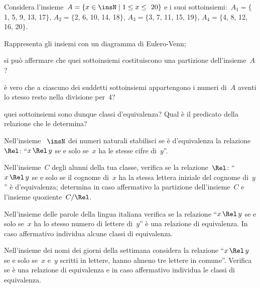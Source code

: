 \begin{multicols}{2}
\begin{esercizio}
\label{ese:7.30}
Considera l'insieme~$A = \{x\in\insN \mid  1 \le x \le~20 \}$ e i suoi
sottoinsiemi:~$A_1 =\{$1, 5, 9, 13, 17$\}$, $A_2 =\{$2, 6, 10, 14, 18$\}$, $A_3 =\{$3, 7, 11, 15, 19$\}$, $A_4 =\{$4, 8, 12, 16, 20$\}$.
\begin{enumeratea}
\item Rappresenta gli insiemi con un diagramma di Eulero-Venn;
\item si può affermare che quei sottoinsiemi costituiscono una partizione dell'insieme~$A$?
\item è vero che a ciascuno dei suddetti sottoinsiemi appartengono i numeri di~$A$ aventi lo stesso resto nella divisione per~4?
\item quei sottoinsiemi sono dunque classi d'equivalenza? Qual è il predicato della relazione che le determina?
\end{enumeratea}
\end{esercizio}

\begin{esercizio}
\label{ese:7.31}
Nell'insieme ~$\insN$ dei numeri naturali stabilisci se è d'equivalenza la relazione~$\Rel$: ``$x \,\Rel\, y$ se e solo se~$x$ ha le stesse cifre di~$y$''.
\end{esercizio}

\begin{esercizio}
\label{ese:7.32}
Nell'insieme~$C$ degli alunni della tua classe, verifica se la relazione~$\Rel$: ``$x \,\Rel\, y$ se e solo se il cognome di~$x$ ha la stessa lettera iniziale del
cognome di~$y$'' è d'equivalenza; determina in caso affermativo la partizione dell'insieme~$C$ e l'insieme quoziente~$C/\Rel$.
\end{esercizio}

\begin{esercizio}
\label{ese:7.33}
Nell'insieme delle parole della lingua italiana verifica se la relazione ``$x \,\Rel\, y$ se e solo se~$x$ ha lo stesso numero di lettere di~$y$'' è
una relazione di equivalenza. In caso affermativo individua alcune classi di
equivalenza.
\end{esercizio}

\begin{esercizio}
\label{ese:7.34}
Nell'insieme dei nomi dei giorni della settimana considera la relazione ``$x \,\Rel\, y$ se e solo se~$x$ e~$y$ scritti in lettere, hanno almeno tre lettere in comune''.
Verifica se è una relazione di equivalenza e in caso affermativo individua le
classi di equivalenza.
\end{esercizio}


\end{multicols}
